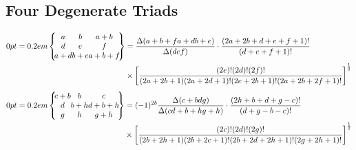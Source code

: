 \subsection{Four Degenerate Triads}\label{sec:10.8.5}
\begin{align}
\ninej{a}{b}{a+b}{d}{e}{f}{a+d}{b+e}{a+b+f}&=\frac{\Delta(a+b+f a+d b+e)}{\Delta(d e f)} \cdot \frac{(2 a+2 b+d+e+f+1)!}{(d+e+f+1)!}  \notag\\
&\times\left[\frac{(2 e)!(2 d)!(2 f)!}{(2 a+2 b+1)(2 a+2 d+1)!(2 e+2 b+1)!(2 a+2 b+2 f+1)!}\right]^{\frac{1}{2}}  \label{eq:10:8:18}
\end{align}
\begin{align}
\ninej{c+b}{b}{c}{d}{b+h}{d+b+h}{g}{h}{g+h}
&=(-1)^{2 b} \frac{\Delta(c+b d g)}{\Delta(c d+b+h g+h)} \cdot \frac{(2 h+b+d+g-c)!}{(d+g-b-c)!}  \notag\\
&\times\left[\frac{(2 c)!(2 d)!(2 g)!}{(2 b+2 h+1)(2 b+2 c+1)!(2 b+2 d+2 h+1)!(2 g+2 h+1)!}\right]^{\frac{1}{2}} \label{eq:10:8:19}
\end{align}
